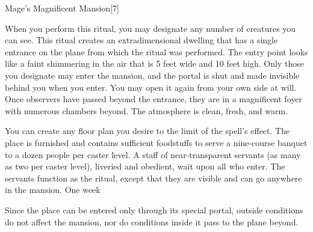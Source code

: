 \begin{spellsection}{Mage's Magnificent Mansion}[7]
    \begin{spellheader}
    \end{spellheader}
    \begin{spellcontent}
        \begin{spelltargetinginfo}
        \end{spelltargetinginfo}
        \begin{spelleffects}

            \spellspecial When you perform this ritual, you may designate any number of creatures you can see.
            \spellline
            \spelleffect This ritual creates an extradimensional dwelling that has a single entrance on the plane from which the ritual was performed. The entry point looks like a faint shimmering in the air that is 5 feet wide and 10 feet high. Only those you designate may enter the mansion, and the portal is shut and made invisible behind you when you enter. You may open it again from your own side at will. Once observers have passed beyond the entrance, they are in a magnificent foyer with numerous chambers beyond. The atmosphere is clean, fresh, and warm.
            \par You can create any floor plan you desire to the limit of the spell's effect. The place is furnished and contains sufficient foodstuffs to serve a nine-course banquet to a dozen people per caster level. A staff of near-transparent servants (as many as two per caster level), liveried and obedient, wait upon all who enter. The servants function as the  ritual, except that they are visible and can go anywhere in the mansion.
            \spelldur One week \dismissable
        \end{spelleffects}
    \end{spellcontent}
    \begin{spellfooter}
        \spellnotes Since the place can be entered only through its special portal, outside conditions do not affect the mansion, nor do conditions inside it pass to the plane beyond.
    \end{spellfooter}
\end{spellsection}

